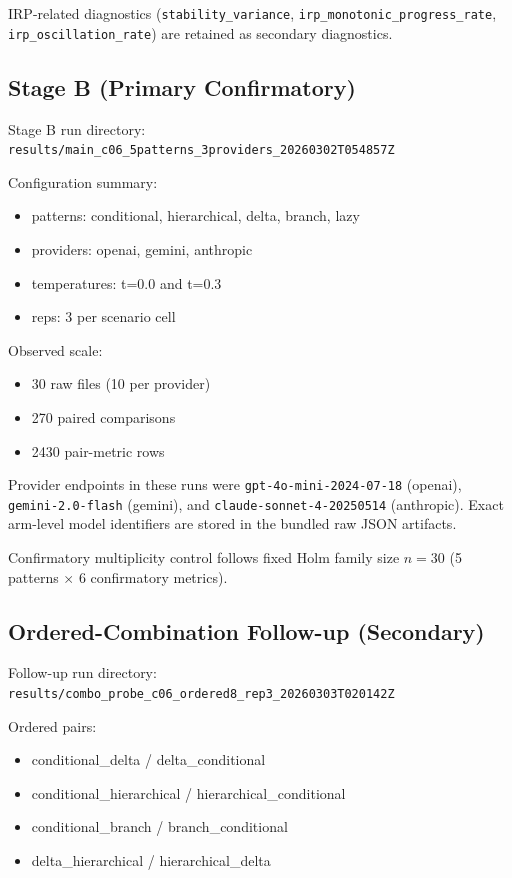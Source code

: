 \documentclass[11pt,a4paper]{article}
\begin{document}
IRP-related diagnostics (\texttt{stability\_variance}, \texttt{irp\_monotonic\_progress\_rate}, \texttt{irp\_oscillation\_rate}) are retained as secondary diagnostics.

\subsection{Stage B (Primary Confirmatory)}

Stage B run directory:
\texttt{results/main\_c06\_5patterns\_3providers\_20260302T054857Z}

Configuration summary:
\begin{itemize}
  \item patterns: conditional, hierarchical, delta, branch, lazy
  \item providers: openai, gemini, anthropic
  \item temperatures: t=0.0 and t=0.3
  \item reps: 3 per scenario cell
\end{itemize}

Observed scale:
\begin{itemize}
  \item 30 raw files (10 per provider)
  \item 270 paired comparisons
  \item 2430 pair-metric rows
\end{itemize}

Provider endpoints in these runs were \texttt{gpt-4o-mini-2024-07-18} (openai), \texttt{gemini-2.0-flash} (gemini), and \texttt{claude-sonnet-4-20250514} (anthropic). Exact arm-level model identifiers are stored in the bundled raw JSON artifacts.

Confirmatory multiplicity control follows fixed Holm family size $n=30$ (5 patterns $\times$ 6 confirmatory metrics).

\subsection{Ordered-Combination Follow-up (Secondary)}

Follow-up run directory:
\texttt{results/combo\_probe\_c06\_ordered8\_rep3\_20260303T020142Z}

Ordered pairs:
\begin{itemize}
  \item conditional\_delta / delta\_conditional
  \item conditional\_hierarchical / hierarchical\_conditional
  \item conditional\_branch / branch\_conditional
  \item delta\_hierarchical / hierarchical\_delta
\end{itemize}
\end{document}

